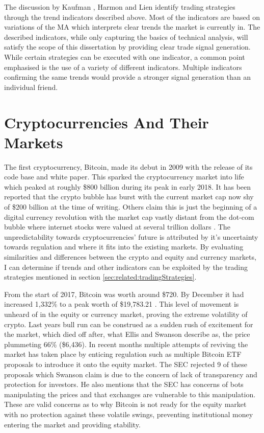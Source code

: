 The discussion by Kaufman \cite{BOOK:Kaufman:2013}, Harmon \cite{BOOK:Harmon:2014} and Lien \cite{BOOK:Lien:2016} identify trading strategies through the trend indicators described above. Most of the indicators are based on variations of the MA which interprets clear trends the market is currently in. The described indicators, while only capturing the basics of technical analysis, will satisfy the scope of this dissertation by providing clear trade signal generation. While certain strategies can be executed with one indicator, a common point emphasised is the use of a variety of different indicators. Multiple indicators confirming the same trends would provide a stronger signal generation than an individual friend. 

\section{Cryptocurrencies And Their Markets}
\label{sec:related:cryptoAndTheirMarkets}

The first cryptocurrency, Bitcoin, made its debut in 2009 with the release of its code base and white paper. This sparked the cryptocurrency market into life which peaked at roughly \$800 billion during its peak in early 2018. It has been reported that the crypto bubble has burst with the current market cap now shy of \$200 billion at the time of writing. Others claim this is just the beginning of a digital currency revolution with the market cap vastly distant from the dot-com bubble where internet stocks were valued at several trillion dollars \cite{ART:Kharpal:2018}. The unpredictability towards cryptocurrencies' future is attributed by it's uncertainty towards regulation and where it fits into the existing markets. By evaluating similarities and differences between the crypto and equity and currency markets, I can determine if trends and other indicators can be exploited by the trading strategies mentioned in section \ref{sec:related:tradingStrategies}.

From the start of 2017, Bitcoin was worth around \$720. By December it had increased 1,332\% to a peak worth of \$19,783.21 \cite{ART:ELLIS:2018}. This level of movement is unheard of in the equity or currency market, proving the extreme volatility of crypto. Last years bull run can be construed as a sudden rush of excitement for the market, which died off after, what Ellis and Swanson describe as, the price plummeting 66\% (\$6,436). In recent months multiple attempts of reviving the market has taken place by enticing regulation such as multiple Bitcoin ETF proposals to introduce it onto the equity market. The SEC rejected 9 of these proposals which Swanson claim is due to the concern of lack of transparency and protection for investors. He also mentions that the SEC has concerns of bots manipulating the prices and that exchanges are vulnerable to this manipulation. These are valid concerns as to why Bitcoin is not ready for the equity market with no protection against these volatile swings, preventing institutional money entering the market and providing stability. 

